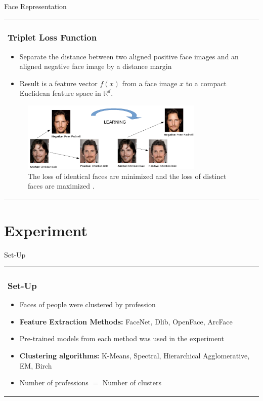 \documentclass[11pt]{beamer}
\begin{document}
\begin{frame}{Face Representation}
\begin{tabular}{l}
\parbox{1\linewidth}{
\frametitle{Triplet Loss Function}
\begin{itemize}
\item Separate the distance between two aligned positive face images and an aligned negative face image by a distance margin
\item Result is a feature vector $f(x)$ from a face image $x$ to a compact Euclidean feature space in $ \mathbb{R}^{d}$.
\end{itemize}
\begin{figure}[!tbp]
 \centering
    \includegraphics[width=0.8\textwidth]{figures/triplet_loss_example.png}
    \caption{The loss of identical faces are minimized and the loss of distinct faces are maximized \cite{pic1} \cite{pic2}.}
	\label{fig:bale}
\end{figure}
}
\end{tabular}  
\end{frame}

\section{Experiment}
\begin{frame}{Set-Up}
\begin{tabular}{l}
\parbox{1\linewidth}{
\frametitle{Set-Up}
\begin{itemize}
\item Faces of people were clustered by profession
\item \textbf{Feature Extraction Methods: } FaceNet, Dlib, OpenFace, ArcFace 
\item Pre-trained models from each method was used in the experiment
\item \textbf{Clustering algorithms: } K-Means, Spectral, Hierarchical Agglomerative, EM, Birch
\item Number of professions $=$ Number of clusters
\end{itemize}
}
\end{tabular}  
\end{frame}
\end{document}

